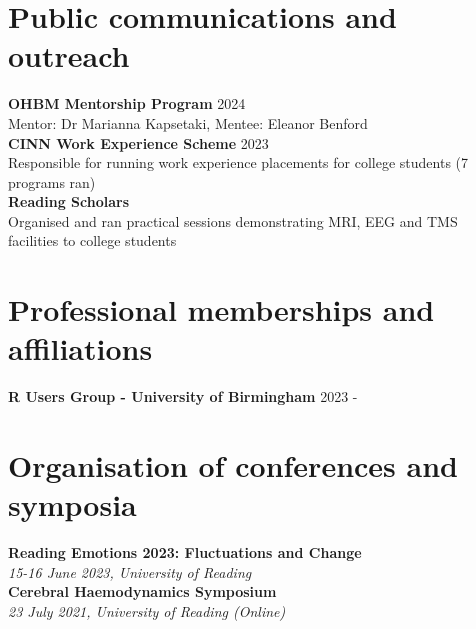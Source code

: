 \documentclass[a4paper,10pt]{article}
\begin{document}
\section{Public communications and outreach}
\vspace{2pt}
\textbf{OHBM Mentorship Program}  \hfill 2024 \\
Mentor: Dr Marianna Kapsetaki, Mentee: Eleanor Benford \\
\vspace{8pt}
\textbf{CINN Work Experience Scheme}  \hfill 2023 \\
Responsible for running work experience placements for college students (7 programs ran) \\
\vspace{8pt}
\textbf{Reading Scholars} \\
Organised and ran practical sessions demonstrating MRI, EEG and TMS facilities to college students\\
\vspace{4pt} 

\section{Professional memberships and affiliations}
\vspace{2pt}
\textbf{R Users Group - University of Birmingham}  \hfill 2023 -  \\
\vspace{8pt}

\section{Organisation of conferences and symposia}
\vspace{2pt}
\textbf{Reading Emotions 2023: Fluctuations and Change}  \\
\textit{15-16 June 2023, University of Reading} \\
\vspace{8pt} 
\textbf{Cerebral Haemodynamics Symposium}  \\
\textit{23 July 2021, University of Reading (Online)} \\
\vspace{4pt}

\end{document}

